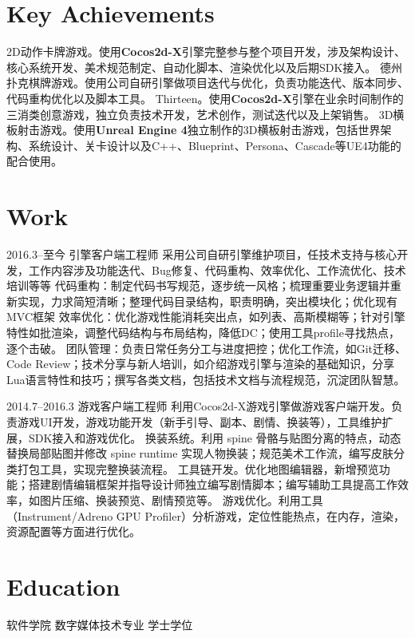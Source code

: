 \documentclass[full]{rvca}
\begin{document}
\subsection{}

\section{Key Achievements}

\achievements
{2D动作卡牌游戏。使用\textbf{Cocos2d-X}引擎完整参与整个项目开发，涉及架构设计、核心系统开发、美术规范制定、自动化脚本、渲染优化以及后期SDK接入。}
{德州扑克棋牌游戏。使用公司自研引擎做项目迭代与优化，负责功能迭代、版本同步、代码重构优化以及脚本工具。}
{Thirteen。使用\textbf{Cocos2d-X}引擎在业余时间制作的三消类创意游戏，独立负责技术开发，艺术创作，测试迭代以及上架销售。}
{3D横板射击游戏。使用\textbf{Unreal Engine 4}独立制作的3D横板射击游戏，包括世界架构、系统设计、关卡设计以及C++、Blueprint、Persona、Cascade等UE4功能的配合使用。}
{}

\section{Work}

{2016.3--至今}
{引擎客户端工程师}
{采用公司自研引擎维护项目，任技术支持与核心开发，工作内容涉及功能迭代、Bug修复、代码重构、效率优化、工作流优化、技术培训等等}
{代码重构：制定代码书写规范，逐步统一风格；梳理重要业务逻辑并重新实现，力求简短清晰；整理代码目录结构，职责明确，突出模块化；优化现有MVC框架}
{效率优化：优化游戏性能消耗突出点，如列表、高斯模糊等；针对引擎特性如批渲染，调整代码结构与布局结构，降低DC；使用工具profile寻找热点，逐个击破。}
{团队管理：负责日常任务分工与进度把控；优化工作流，如Git迁移、Code Review；技术分享与新人培训，如介绍游戏引擎与渲染的基础知识，分享Lua语言特性和技巧；撰写各类文档，包括技术文档与流程规范，沉淀团队智慧。}
{}

{2014.7--2016.3}%
{游戏客户端工程师} %
{利用Cocos2d-X游戏引擎做游戏客户端开发。负责游戏UI开发，游戏功能开发（新手引导、副本、剧情、换装等），工具维护扩展，SDK接入和游戏优化。}%
{换装系统。利用 spine 骨骼与贴图分离的特点，动态替换局部贴图并修改 spine runtime 实现人物换装；规范美术工作流，编写皮肤分类打包工具，实现完整换装流程。}
{工具链开发。优化地图编辑器，新增预览功能；搭建剧情编辑框架并指导设计师独立编写剧情脚本；编写辅助工具提高工作效率，如图片压缩、换装预览、剧情预览等。}
{游戏优化。利用工具（Instrument/Adreno GPU Profiler）分析游戏，定位性能热点，在内存，渲染，资源配置等方面进行优化。}
{}

\section{Education}

{{软件学院}}
{数字媒体技术专业} {学士学位}
\end{document}
